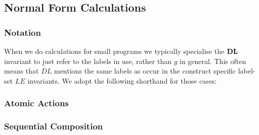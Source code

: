 \subsection{Normal Form Calculations}\label{ssec:nf-calc}

\subsubsection{Notation}

When we do calculations for small programs
we typically specialise the $\mathbf{DL}$ invariant to just refer
to the labels in use, rather than $g$ in general.
This often means that $DL$ mentions the same labels as occur
in the construct specific label-set $LE$ invariants.
We adopt the following shorthand for those cases:

\subsubsection{Atomic Actions}



\subsubsection{Sequential Composition}




